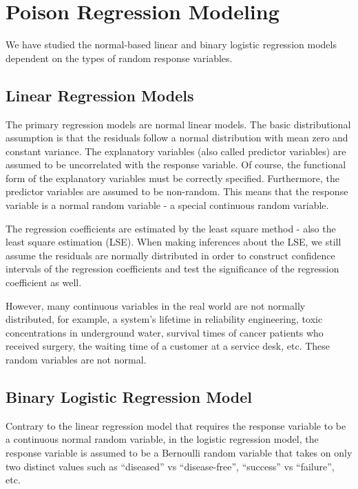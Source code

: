 \documentclass[
]{book}
\begin{document}
\hypertarget{poison-regression-modeling}{%
\chapter{Poison Regression Modeling}\label{poison-regression-modeling}}

We have studied the normal-based linear and binary logistic regression models dependent on the types of random response variables.

\hypertarget{linear-regression-models}{%
\section{Linear Regression Models}\label{linear-regression-models}}

The primary regression models are normal linear models. The basic distributional assumption is that the residuals follow a normal distribution with mean zero and constant variance. The explanatory variables (also called predictor variables) are assumed to be uncorrelated with the response variable. Of course, the functional form of the explanatory variables must be correctly specified. Furthermore, the predictor variables are assumed to be non-random. This means that the response variable is a normal random variable - a special continuous random variable.

The regression coefficients are estimated by the least square method - also the least square estimation (LSE). When making inferences about the LSE, we still assume the residuals are normally distributed in order to construct confidence intervals of the regression coefficients and test the significance of the regression coefficient as well.

However, many continuous variables in the real world are not normally distributed, for example, a system's lifetime in reliability engineering, toxic concentrations in underground water, survival times of cancer patients who received surgery, the waiting time of a customer at a service desk, etc. These random variables are not normal.

\hypertarget{binary-logistic-regression-model}{%
\section{Binary Logistic Regression Model}\label{binary-logistic-regression-model}}

Contrary to the linear regression model that requires the response variable to be a continuous normal random variable, in the logistic regression model, the response variable is assumed to be a Bernoulli random variable that takes on only two distinct values such as ``diseased'' vs ``disease-free'', ``success'' vs ``failure'', etc.
\end{document}

